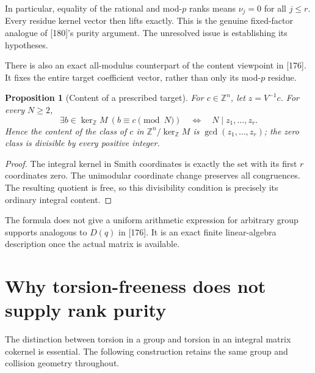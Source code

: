 \documentclass[11pt,a4paper,oneside]{report}
\newtheorem{proposition}[theorem]{Proposition}
\theoremstyle{definition}
\theoremstyle{remark}
\newcommand{\Z}{\mathbb Z}
\begin{document}
In particular, equality of the rational and mod-$p$ ranks means
$\nu_j=0$ for all $j\le r$. Every residue kernel vector then lifts
exactly. This is the genuine fixed-factor analogue of [180]'s purity
argument. The unresolved issue is establishing its hypotheses.

There is also an exact all-modulus counterpart of the content viewpoint
in [176]. It fixes the entire target coefficient vector, rather than
only its mod-$p$ residue.

\begin{proposition}[Content of a prescribed target]\label{M04:prop:content}
For $c\in\Z^n$, let $z=V^{-1}c$. For every $N\ge2$,
\[
\exists b\in\ker_{\Z}M\ (b\equiv c\pmod N)
\quad\Longleftrightarrow\quad N\mid z_1,\ldots,z_r.
\]
Hence the content of the class of $c$ in
$\Z^n/\ker_{\Z}M$ is $\gcd(z_1,\ldots,z_r)$; the zero class is
divisible by every positive integer.
\end{proposition}
\begin{proof}
The integral kernel in Smith coordinates is exactly the set with its
first $r$ coordinates zero. The unimodular coordinate change preserves
all congruences. The resulting quotient is free, so this divisibility
condition is precisely its ordinary integral content.
\end{proof}

The formula does not give a uniform arithmetic expression for arbitrary
group supports analogous to $D(q)$ in [176]. It is an exact finite
linear-algebra description once the actual matrix is available.

\section{Why torsion-freeness does not supply rank purity}

The distinction between torsion in a group and torsion in an integral
matrix cokernel is essential. The following construction retains the
same group and collision geometry throughout.
\end{document}
